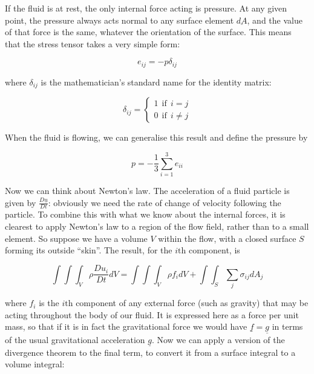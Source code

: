   If the fluid is at rest, the only internal force acting is pressure. At any 
  given point, the pressure always acts normal to any surface element 
  $\underline{dA}$, and the value of that force is the same, whatever the 
  orientation of the surface. This means that the stress tensor takes a very 
  simple form: 

  \begin{equation*}e_{ij}=-p \delta_{ij} \tag{15}\end{equation*} 

  \noindent{}where $\delta_{ij}$ is the mathematician's standard name for the 
  identity matrix: 

  \begin{equation*}\delta_{ij} = \left\lbrace \begin{matrix} {1 \mathrm{~~if~~} 
  i=j}\\{0 \mathrm{~~if~~} i\ne j}\end{matrix} \right. \tag{16}\end{equation*} 

  When the fluid is flowing, we can generalise this result and define the 
  pressure by 

  \begin{equation*}p=-\dfrac{1}{3} \sum_{i=1}^3{e_{ii}} \tag{17}\end{equation*} 

  Now we can think about Newton's law. The acceleration of a fluid particle is 
  given by $\frac{D\underline{u}}{Dt}$: obviously we need the rate of change of 
  velocity following the particle. To combine this with what we know about the 
  internal forces, it is clearest to apply Newton's law to a region of the flow 
  field, rather than to a small element. So suppose we have a volume $V$ within 
  the flow, with a closed surface $S$ forming its outside ``skin''. The result, 
  for the $i\mathrm{th}$ component, is 

  \begin{equation*}\int{\int{\int_V{\rho \dfrac{Du_i}{Dt} 
  dV}}}=\int{\int{\int_V{\rho f_i dV}}}+\int{\int_S{\sum_j{\sigma_{ij} dA_j }}} 
  \tag{18}\end{equation*} 

  \noindent{}where $f_i$ is the $i\mathrm{th}$ component of any external force 
  (such as gravity) that may be acting throughout the body of our fluid. It is 
  expressed here as a force per unit mass, so that if it is in fact the 
  gravitational force we would have $\underline{f}=\underline{g}$ in terms of 
  the usual gravitational acceleration $\underline{g}$. Now we can apply a 
  version of the divergence theorem to the final term, to convert it from a 
  surface integral to a volume integral: 

